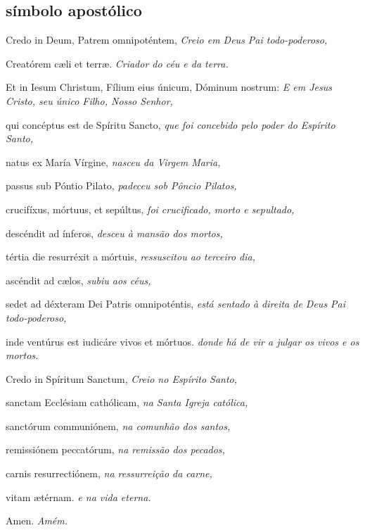 \subsection{símbolo apostólico}

\begin{paracol}{2}
  Credo in Deum, Patrem omnipoténtem,
  \switchcolumn
  \emph{Creio em Deus Pai todo-poderoso,}
  \switchcolumn*

  Creatórem c{\ae}li et terr{\ae}.
  \switchcolumn
  \emph{Criador do céu e da terra.}
  \switchcolumn*

  Et in Iesum Christum, Fílium eius únicum, Dóminum nostrum:
  \switchcolumn
  \emph{E em Jesus Cristo, seu único Filho, Nosso Senhor,}
  \switchcolumn*

  qui concéptus est de Spíritu Sancto,
  \switchcolumn
  \emph{que foi concebido pelo poder do Espírito Santo,}
  \switchcolumn*

  natus ex María Vírgine,
  \switchcolumn
  \emph{nasceu da Virgem Maria,}
  \switchcolumn*

  passus sub Póntio Pilato,
  \switchcolumn
  \emph{padeceu sob Pôncio Pilatos,}
  \switchcolumn*

  crucifíxus, mórtuus, et sepúltus,
  \switchcolumn
  \emph{foi crucificado, morto e sepultado,}
  \switchcolumn*

  descéndit ad ínferos,
  \switchcolumn
  \emph{desceu à mansão dos mortos,}
  \switchcolumn*

  tértia die resurréxit a mórtuis,
  \switchcolumn
  \emph{ressuscitou ao terceiro dia,}
  \switchcolumn*

  ascéndit ad c{\ae}los,
  \switchcolumn
  \emph{subiu aos céus,}
  \switchcolumn*

  sedet ad déxteram Dei Patris omnipoténtis,
  \switchcolumn
  \emph{está sentado à direita de Deus Pai todo-poderoso,}
  \switchcolumn*

  inde ventúrus est iudicáre vivos et mórtuos.
  \switchcolumn
  \emph{donde há de vir a julgar os vivos e os mortos.}
  \switchcolumn*

  Credo in Spíritum Sanctum,
  \switchcolumn
  \emph{Creio no Espírito Santo,}
  \switchcolumn*

  sanctam Ecclésiam cathólicam,
  \switchcolumn
  \emph{na Santa Igreja católica,}
  \switchcolumn*

  sanctórum communiónem,
  \switchcolumn
  \emph{na comunhão dos santos,}
  \switchcolumn*

  remissiónem peccatórum,
  \switchcolumn
  \emph{na remissão dos pecados,}
  \switchcolumn*

  carnis resurrectiónem,
  \switchcolumn
  \emph{na ressurreição da carne,}
  \switchcolumn*

  vitam {\ae}térnam.
  \switchcolumn
  \emph{e na vida eterna.}
  \switchcolumn*

  Amen.
  \switchcolumn
  \emph{Amém.}
\end{paracol}

